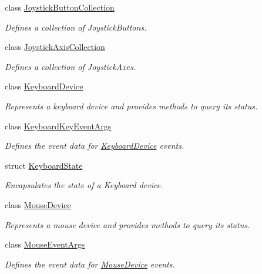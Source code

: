 \begin{DoxyCompactItemize}
class \hyperlink{class_open_t_k_1_1_input_1_1_joystick_button_collection}{Joystick\-Button\-Collection}
\begin{DoxyCompactList}\small\item\em Defines a collection of Joystick\-Buttons. \end{DoxyCompactList}\item 
class \hyperlink{class_open_t_k_1_1_input_1_1_joystick_axis_collection}{Joystick\-Axis\-Collection}
\begin{DoxyCompactList}\small\item\em Defines a collection of Joystick\-Axes. \end{DoxyCompactList}\item 
class \hyperlink{class_open_t_k_1_1_input_1_1_keyboard_device}{Keyboard\-Device}
\begin{DoxyCompactList}\small\item\em Represents a keyboard device and provides methods to query its status. \end{DoxyCompactList}\item 
class \hyperlink{class_open_t_k_1_1_input_1_1_keyboard_key_event_args}{Keyboard\-Key\-Event\-Args}
\begin{DoxyCompactList}\small\item\em Defines the event data for \hyperlink{class_open_t_k_1_1_input_1_1_keyboard_device}{Keyboard\-Device} events. \end{DoxyCompactList}\item 
struct \hyperlink{struct_open_t_k_1_1_input_1_1_keyboard_state}{Keyboard\-State}
\begin{DoxyCompactList}\small\item\em Encapsulates the state of a Keyboard device. \end{DoxyCompactList}\item 
class \hyperlink{class_open_t_k_1_1_input_1_1_mouse_device}{Mouse\-Device}
\begin{DoxyCompactList}\small\item\em Represents a mouse device and provides methods to query its status. \end{DoxyCompactList}\item 
class \hyperlink{class_open_t_k_1_1_input_1_1_mouse_event_args}{Mouse\-Event\-Args}
\begin{DoxyCompactList}\small\item\em Defines the event data for \hyperlink{class_open_t_k_1_1_input_1_1_mouse_device}{Mouse\-Device} events. \end{DoxyCompactList}\item 

\end{DoxyCompactItemize}
